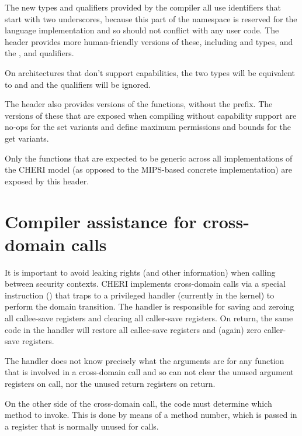 The new types and qualifiers provided by the compiler all use identifiers that start with two underscores, because this part of the namespace is reserved for the language implementation and so should not conflict with any user code.
The  header provides more human-friendly versions of these, including  and  types, and the ,  and  qualifiers.

On architectures that don't support capabilities, the two types will be equivalent to  and  and the qualifiers will be ignored.

The header also provides versions of the  functions, without the  prefix.
The versions of these that are exposed when compiling without capability support are no-ops for the set variants and define maximum permissions and bounds for the get variants.

Only the functions that are expected to be generic across all implementations of the CHERI model (as opposed to the MIPS-based concrete implementation) are exposed by this header.

\section{Compiler assistance for cross-domain calls}
\label{sec:cccall}

It is important to avoid leaking rights (and other information) when calling between security contexts.  CHERI implements cross-domain calls via a special instruction () that traps to a privileged handler (currently in the kernel) to perform the domain transition.  The handler is responsible for saving and zeroing all callee-save registers and clearing all caller-save registers.  On return, the same code in the handler will restore all callee-save registers and (again) zero caller-save registers.

The handler does not know precisely what the arguments are for any function that is involved in a cross-domain call and so can not clear the unused argument registers on call, nor the unused return registers on return.

On the other side of the cross-domain call, the code must determine which method to invoke.  This is done by means of a method number, which is passed in a register that is normally unused for calls.

